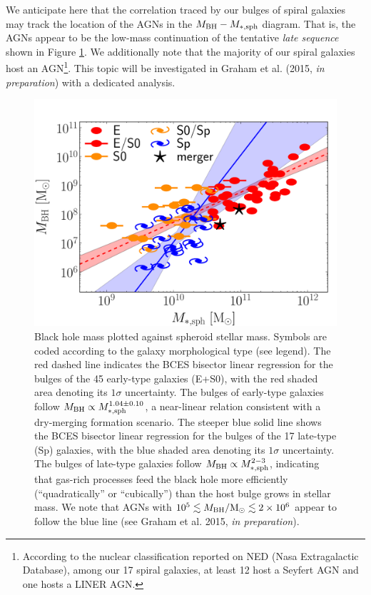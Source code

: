 \documentclass[preprint2]{emulateapj}
\begin{document}
We anticipate here that the correlation traced by our bulges of spiral galaxies 
may track the location of the AGNs in the $M_{\rm BH} - M_{\rm *,sph}$ diagram.
That is, the AGNs appear to be the low-mass continuation of the tentative \emph{late sequence} shown in Figure \ref{fig:mbhmasssph}. 
We additionally note that the majority of our spiral galaxies host an AGN\footnote{According to the nuclear classification reported on NED 
(Nasa Extragalactic Database), among our 17 spiral galaxies, at least 12 host a Seyfert AGN and one hosts a LINER AGN.}.
This topic will be investigated in Graham et al. (2015, \emph{in preparation}) with a dedicated analysis. \\
 

\begin{figure}[h]
\begin{center}
\includegraphics[width=\columnwidth]{images/mbh_vs_mass_sph.pdf}
\caption{Black hole mass plotted against spheroid stellar mass. 
Symbols are coded according to the galaxy morphological type (see legend).
The red dashed line indicates the BCES bisector linear regression for the bulges of the 45 early-type galaxies (E+S0), 
with the red shaded area denoting its $1\sigma$ uncertainty. 
The bulges of early-type galaxies follow $M_{\rm BH} \propto M_{\rm *,sph}^{1.04 \pm 0.10}$,
a near-linear relation consistent with a dry-merging formation scenario.
The steeper blue solid line shows the BCES bisector linear regression for the bulges of the 17 late-type (Sp) galaxies, 
with the blue shaded area denoting its $1\sigma$ uncertainty. 
The bulges of late-type galaxies follow $M_{\rm BH} \propto M_{\rm *,sph}^{2-3}$, 
indicating that gas-rich processes feed the black hole more efficiently (``quadratically'' or ``cubically'') than the host bulge grows in stellar mass. 
We note that AGNs with $10^5 \lesssim M_{\rm BH}/{\rm M_\odot} \lesssim 2 \times 10^6$ \citep{jiang2011a} appear to follow the blue line 
(see Graham et al. 2015, \emph{in preparation}).}
\label{fig:mbhmasssph}
\end{center}
\end{figure}
\end{document}
